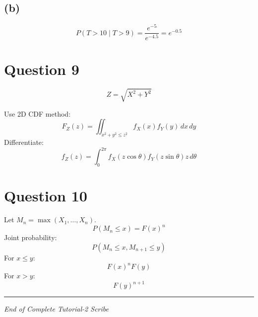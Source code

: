 \documentclass[11pt]{article}
\begin{document}
\subsection*{(b)}
\[
P(T>10 \mid T>9) = \frac{e^{-5}}{e^{-4.5}} = e^{-0.5}
\]

\section*{Question 9}
\[
Z = \sqrt{X^2+Y^2}
\]



Use 2D CDF method:
\[
F_Z(z) = \iint_{x^2+y^2 \le z^2} f_X(x)f_Y(y) \, dx \, dy
\]
Differentiate:
\[
f_Z(z) = \int_0^{2\pi} f_X(z\cos\theta) f_Y(z\sin\theta) z \, d\theta
\]

\section*{Question 10}
Let $M_n = \max(X_1,\dots,X_n)$.
\[
P(M_n \le x) = F(x)^n
\]
Joint probability:
\[
P(M_n \le x, M_{n+1} \le y)
\]
For $x \le y$:
\[
F(x)^n F(y)
\]
For $x > y$:
\[
F(y)^{n+1}
\]

\bigskip
\hrule
\vspace{0.2cm}
\begin{center}
    \small \textit{End of Complete Tutorial-2 Scribe}
\end{center}
\end{document}

